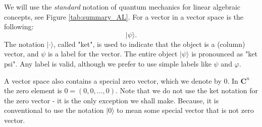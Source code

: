 We will use the \textit{standard} notation of quantum mechanics for linear algebraic concepts, see Figure \ref{tab:summary_AL}. For a vector in a vector space is the following:
$$
|\psi\rangle .
$$
The notation $|\cdot\rangle$, called "ket", is used to indicate that the object is a (column) vector, and $\psi$ is a label for the vector. The entire object $|\psi\rangle$ is pronounced  as "ket psi". Any label is valid, although we prefer to use simple labels like $\psi$ and $\varphi$.

\begin{remark} %
    A vector space also contains a special zero vector, which we denote by 0. In $\mathbf{C}^{n}$ the zero element is $0=(0,0, \ldots, 0)$. Note that we do not use the ket notation for the zero vector - it is the only exception we shall make. Because, it is conventional to use the notation $|0\rangle$ to mean some special vector that is not zero vector.
\end{remark}

